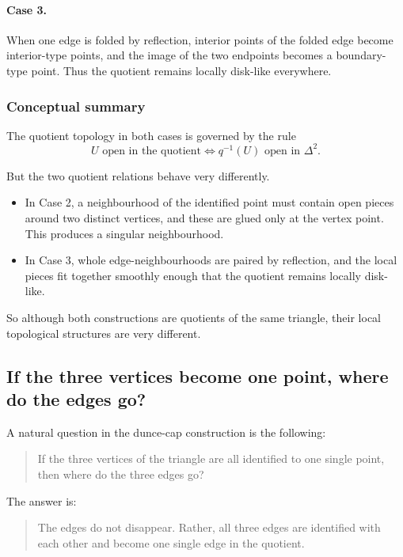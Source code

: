 \documentclass[12pt,a4paper]{article}
\theoremstyle{notespace}
\begin{document}
\paragraph{Case 3.}
When one edge is folded by reflection, interior points of the folded edge become interior-type points, and the image of the two endpoints becomes a boundary-type point. Thus the quotient remains locally disk-like everywhere.

\subsubsection{Conceptual summary}

The quotient topology in both cases is governed by the rule
\[
U\text{ open in the quotient}
\Longleftrightarrow
q^{-1}(U)\text{ open in }\Delta^2.
\]

But the two quotient relations behave very differently.

\begin{itemize}
	\item In Case 2, a neighbourhood of the identified point must contain open pieces around two distinct vertices, and these are glued only at the vertex point. This produces a singular neighbourhood.
	\item In Case 3, whole edge-neighbourhoods are paired by reflection, and the local pieces fit together smoothly enough that the quotient remains locally disk-like.
\end{itemize}

So although both constructions are quotients of the same triangle, their local topological structures are very different.

\subsection{If the three vertices become one point, where do the edges go?}

A natural question in the dunce-cap construction is the following:

\begin{quote}
	If the three vertices of the triangle are all identified to one single point, then where do the three edges go?
\end{quote}

The answer is:

\begin{quote}
	The edges do not disappear. Rather, all three edges are identified with each other and become one single edge in the quotient.
\end{quote}
\end{document}
